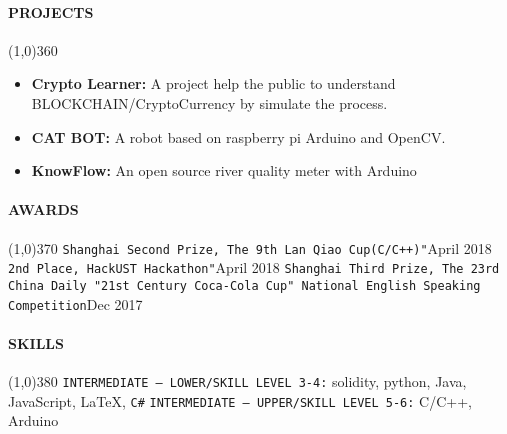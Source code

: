 \documentclass{article}
\begin{document}
\paragraph{PROJECTS}
\line(1,0){360}
\begin{itemize}
\item{\textbf{Crypto Learner:} A project help the public to understand BLOCKCHAIN/CryptoCurrency by simulate the process.
}
\item{\textbf{CAT BOT:} A robot based on raspberry pi Arduino and OpenCV.
}
\item{\textbf{KnowFlow:} An open source river quality meter with Arduino
}

\end{itemize}
\paragraph{AWARDS}
\line(1,0){370}
\newline
\texttt{Shanghai Second Prize, The 9th Lan Qiao Cup(C/C++)"}\hfill{April 2018}
\newline
\texttt{2nd Place, HackUST Hackathon"}\hfill{April 2018}
\newline
\texttt{Shanghai Third Prize, The 23rd China Daily "21st Century Coca-Cola Cup" National 
\newline English Speaking Competition}\hfill{Dec 2017}
\newline

\paragraph{SKILLS}
\line(1,0){380}
\newline
\texttt{INTERMEDIATE – LOWER/SKILL LEVEL 3-4:}
 solidity, python, Java, JavaScript, \LaTeX, \texttt{C\#}
 {}
 \newline
 \texttt{INTERMEDIATE – UPPER/SKILL LEVEL 5-6:}
 C/C++, Arduino{}
 
\end{document}
